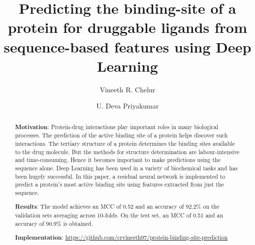 \documentclass[journal=jacsat,manuscript=article]{achemso}
\author{Vineeth R. Chelur}
\author{U. Deva Priyakumar}
\affiliation[IIIT-H]
{Center for Computational Natural Sciences \& Bioinformatics, IIIT-H, Hyderabad}
\title[Predicting the binding-site of a protein for druggable ligands from sequence-based features using Deep Learning]
  {Predicting the binding-site of a protein for druggable ligands from sequence-based features using Deep Learning
  }
\begin{document}






\begin{abstract}
    \noindent\textbf{Motivation}: Protein-drug interactions play important roles in many biological processes. The prediction of the active binding site of a protein helps discover such interactions. The tertiary structure of a protein determines the binding sites available to the drug molecule. But the methods for structure determination are labour-intensive and time-consuming. Hence it becomes important to make predictions using the sequence alone. Deep Learning has been used in a variety of biochemical tasks and has been hugely successful. In this paper, a residual neural network is implemented to predict a protein's most active binding site using features extracted from just the sequence.

    \noindent\textbf{Results}: The model achieves an MCC of 0.52 and an accuracy of 92.2\% on the validation sets averaging across 10-folds. On the test set, an MCC of 0.51 and an accuracy of 90.9\% is obtained.

    \noindent\textbf{Implementation}: \href{https://github.com/crvineeth97/protein-binding-site-prediction}{https://github.com/crvineeth97/protein-binding-site-prediction}
\end{abstract}
\end{document}

